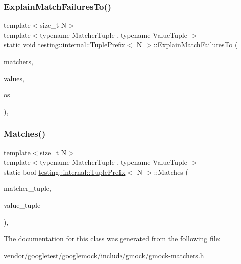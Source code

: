 \subsubsection{\texorpdfstring{Explain\+Match\+Failures\+To()}{ExplainMatchFailuresTo()}}
{\footnotesize\ttfamily template$<$size\+\_\+t N$>$ \\
template$<$typename Matcher\+Tuple , typename Value\+Tuple $>$ \\
static void \hyperlink{classtesting_1_1internal_1_1_tuple_prefix}{testing\+::internal\+::\+Tuple\+Prefix}$<$ N $>$\+::Explain\+Match\+Failures\+To (\begin{DoxyParamCaption}\item[{const \hyperlink{structtesting_1_1internal_1_1_matcher_tuple}{Matcher\+Tuple} \&}]{matchers,  }\item[{const Value\+Tuple \&}]{values,  }\item[{\+::std\+::ostream $\ast$}]{os }\end{DoxyParamCaption})\hspace{0.3cm}{\ttfamily [inline]}, {\ttfamily [static]}}

\mbox{\label{classtesting_1_1internal_1_1_tuple_prefix_ada24ceee73c02e3bb7f8264143170f7a}} 
\subsubsection{\texorpdfstring{Matches()}{Matches()}}
{\footnotesize\ttfamily template$<$size\+\_\+t N$>$ \\
template$<$typename Matcher\+Tuple , typename Value\+Tuple $>$ \\
static bool \hyperlink{classtesting_1_1internal_1_1_tuple_prefix}{testing\+::internal\+::\+Tuple\+Prefix}$<$ N $>$\+::Matches (\begin{DoxyParamCaption}\item[{const \hyperlink{structtesting_1_1internal_1_1_matcher_tuple}{Matcher\+Tuple} \&}]{matcher\+\_\+tuple,  }\item[{const Value\+Tuple \&}]{value\+\_\+tuple }\end{DoxyParamCaption})\hspace{0.3cm}{\ttfamily [inline]}, {\ttfamily [static]}}



The documentation for this class was generated from the following file\+:\begin{DoxyCompactItemize}
\item 
vendor/googletest/googlemock/include/gmock/\hyperlink{gmock-matchers_8h}{gmock-\/matchers.\+h}\end{DoxyCompactItemize}
